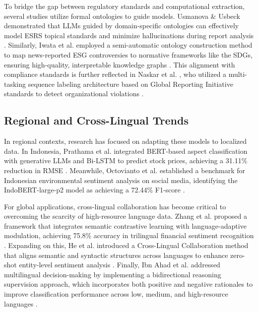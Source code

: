 \documentclass[english, online, cse, master]{dithesis}
\begin{document}
To bridge the gap between regulatory standards and computational extraction, several studies utilize formal ontologies to guide models. Usmanova \& Usbeck  \parencite{aida_usmanova_e9b44e1d} demonstrated that LLMs guided by domain-specific ontologies can effectively model ESRS topical standards and minimize hallucinations during report analysis  \parencite{aida_usmanova_e9b44e1d}. Similarly, Iwata et al.  \parencite{tsuyoshi_iwata_18ccc0b8} employed a semi-automatic ontology construction method to map news-reported ESG controversies to normative frameworks like the SDGs, ensuring high-quality, interpretable knowledge graphs  \parencite{tsuyoshi_iwata_18ccc0b8}. This alignment with compliance standards is further reflected in Naskar et al.  \parencite{abir_naskar_17efeb7b}, who utilized a multi-tasking sequence labeling architecture based on Global Reporting Initiative standards to detect organizational violations  \parencite{abir_naskar_17efeb7b}.
\subsection{Regional and Cross-Lingual Trends}

In regional contexts, research has focused on adapting these models to localized data. In Indonesia, Prathama et al.  \parencite{ubaidillah_ariq_prathama_a1856e2f} integrated BERT-based aspect classification with generative LLMs and Bi-LSTM to predict stock prices, achieving a 31.11\% reduction in RMSE  \parencite{ubaidillah_ariq_prathama_a1856e2f}. Meanwhile, Octovianto et al.  \parencite{christofer_octovianto_487e90aa} established a benchmark for Indonesian environmental sentiment analysis on social media, identifying the IndoBERT-large-p2 model as achieving a 72.44\% F1-score  \parencite{christofer_octovianto_487e90aa}.

For global applications, cross-lingual collaboration has become critical to overcoming the scarcity of high-resource language data. Zhang et al.  \parencite{liman_zhang_ec332205} proposed a framework that integrates semantic contrastive learning with language-adaptive modulation, achieving 75.8\% accuracy in trilingual financial sentiment recognition  \parencite{liman_zhang_ec332205}. Expanding on this, He et al.  \parencite{association_for_computational_linguistics_2025_5a25f994} introduced a Cross-Lingual Collaboration method that aligns semantic and syntactic structures across languages to enhance zero-shot entity-level sentiment analysis  \parencite{association_for_computational_linguistics_2025_5a25f994}. Finally, Ibn Ahad et al.  \parencite{association_for_computational_linguistics_2025_1ba46dee} addressed multilingual decision-making by implementing a bidirectional reasoning supervision approach, which incorporates both positive and negative rationales to improve classification performance across low, medium, and high-resource languages  \parencite{association_for_computational_linguistics_2025_1ba46dee}.
\end{document}
